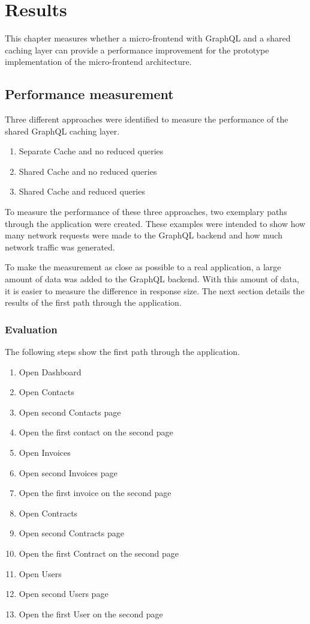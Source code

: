 \chapter{Results}\label{chapter:results}

This chapter measures whether a micro-frontend with GraphQL and a shared caching layer can provide a performance improvement for the prototype implementation of the micro-frontend architecture. 

\section{Performance measurement}

Three different approaches were identified to measure the performance of the shared GraphQL caching layer.

\begin{enumerate}
    \item Separate Cache and no reduced queries
    \item Shared Cache and no reduced queries
    \item Shared Cache and reduced queries
\end{enumerate}

To measure the performance of these three approaches, two exemplary paths through the application were created. These examples were intended to show how many network requests were made to the GraphQL backend and how much network traffic was generated.

To make the measurement as close as possible to a real application, a large amount of data was added to the GraphQL backend. With this amount of data, it is easier to measure the difference in response size. The next section details the results of the first path through the application.

\subsection{Evaluation}

The following steps show the first path through the application. 

\begin{enumerate}
    \item Open Dashboard
    \item Open Contacts
    \item Open second Contacts page
    \item Open the first contact on the second page
    \item Open Invoices
    \item Open second Invoices page
    \item Open the first invoice on the second page
    \item Open Contracts
    \item Open second Contracts page
    \item Open the first Contract on the second page
    \item Open Users
    \item Open second Users page
    \item Open the first User on the second page
\end{enumerate}

